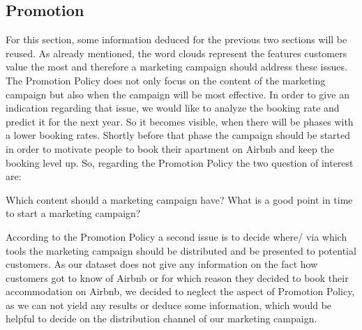 \documentclass[journal]{IEEEtran}
\begin{document}
\subsection{Promotion}
\noindent For this section, some information deduced for the previous two sections will be reused. As already mentioned, the word clouds represent the features customers value the most and therefore a marketing campaign should address these issues.\\
The Promotion Policy does not only focus on the content of the marketing campaign but also when the campaign will be most effective. In order to give an indication regarding that issue, we would like to analyze the booking rate and predict it for the next year. So it becomes visible, when there will be phases with a lower booking rates. Shortly before that phase the campaign should be started in order to motivate people to book their apartment on Airbnb and keep the booking level up. So, regarding the Promotion Policy the two question of interest are:
\begin{itshape}
Which content should a marketing campaign have?
What is a good point in time to start a marketing campaign?
\end{itshape}
According to the Promotion Policy a second issue is to decide where/ via which tools the marketing campaign should be distributed and be presented to potential customers. As our dataset does not give any information on the fact how customers got to know of Airbnb or for which reason they decided to book their accommodation on Airbnb, we decided to neglect the aspect of Promotion Policy, as we can not yield any results or deduce some information, which would be helpful to decide on the distribution channel of our marketing campaign. 
%
%
\end{document}
